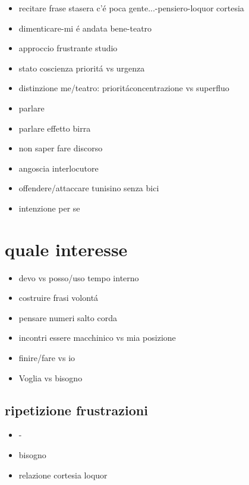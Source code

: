 \begin{itemize}
\item recitare frase stasera c'\'e poca gente...-pensiero-loquor cortesia
\item dimenticare-mi \'e andata bene-teatro
\item approccio frustrante studio
\item stato coscienza priorit\'a vs urgenza
\item distinzione me/teatro: priorit\'aconcentrazione vs superfluo
\item parlare
\item parlare effetto birra
\item non saper fare discorso
\item angoscia interlocutore
\item offendere/attaccare tunisino senza bici
\item intenzione per se
\end{itemize}

\section{quale interesse}

\begin{itemize}
\item devo vs posso/uso tempo interno
\item costruire frasi volont\'a
\item pensare numeri salto corda
\item incontri essere macchinico vs mia posizione
\item finire/fare vs io
\item Voglia vs bisogno
\end{itemize}

\subsection{ripetizione frustrazioni}

\begin{itemize}
\item {}-
\item {} bisogno
\item relazione cortesia loquor
\end{itemize}

